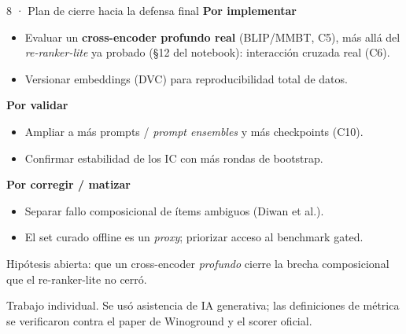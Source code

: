 \documentclass[aspectratio=169]{beamer}
\begin{document}
\begin{frame}{8 · Plan de cierre hacia la defensa final}
  \footnotesize
  \setlength{\itemsep}{1pt}
  \textbf{Por implementar}
  \begin{itemize}\itemsep1pt
    \item Evaluar un \textbf{cross-encoder profundo real} (BLIP/MMBT, C5), más allá del
    \emph{re-ranker-lite} ya probado (§12 del notebook): interacción cruzada real (C6).
    \item Versionar embeddings (DVC) para reproducibilidad total de datos.
  \end{itemize}
  \vspace{-3pt}\textbf{Por validar}
  \begin{itemize}\itemsep1pt
    \item Ampliar a más prompts / \emph{prompt ensembles} y más checkpoints (C10).
    \item Confirmar estabilidad de los IC con más rondas de bootstrap.
  \end{itemize}
  \vspace{-3pt}\textbf{Por corregir / matizar}
  \begin{itemize}\itemsep1pt
    \item Separar fallo composicional de ítems ambiguos (Diwan et al.).
    \item El set curado offline es un \emph{proxy}; priorizar acceso al benchmark gated.
  \end{itemize}
  \vspace{1pt}
  \centering\scriptsize Hipótesis abierta: que un cross-encoder \emph{profundo} cierre la brecha composicional que el re-ranker-lite no cerró.
  \par\vspace{1pt}
  {\scriptsize\color{gris} Trabajo individual. Se usó asistencia de IA generativa; las definiciones de métrica se verificaron contra el paper de Winoground y el scorer oficial.}
\end{frame}
\end{document}
